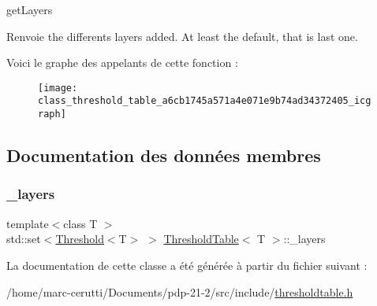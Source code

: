 get\+Layers 

\begin{DoxyReturn}{Renvoie}
the differents layers added. At least the default, that is last one. 
\end{DoxyReturn}
Voici le graphe des appelants de cette fonction \+:
\nopagebreak
\begin{figure}[H]
\begin{center}
\leavevmode
\texttt{[image: class\_threshold\_table\_a6cb1745a571a4e071e9b74ad34372405\_icgraph]}
\end{center}
\end{figure}


\subsection{Documentation des données membres}
\mbox{\label{class_threshold_table_aa85ce39b849283e9fd2a26d6571646a2}} 
\subsubsection{\texorpdfstring{\+\_\+layers}{\_layers}}
{\footnotesize\ttfamily template$<$class T $>$ \\
std\+::set$<$\hyperlink{struct_threshold}{Threshold}$<$T$>$ $>$ \hyperlink{class_threshold_table}{Threshold\+Table}$<$ T $>$\+::\+\_\+layers\hspace{0.3cm}{\ttfamily [private]}}



La documentation de cette classe a été générée à partir du fichier suivant \+:\begin{DoxyCompactItemize}
\item 
/home/marc-\/cerutti/\+Documents/pdp-\/21-\/2/src/include/\hyperlink{thresholdtable_8h}{thresholdtable.\+h}\end{DoxyCompactItemize}
